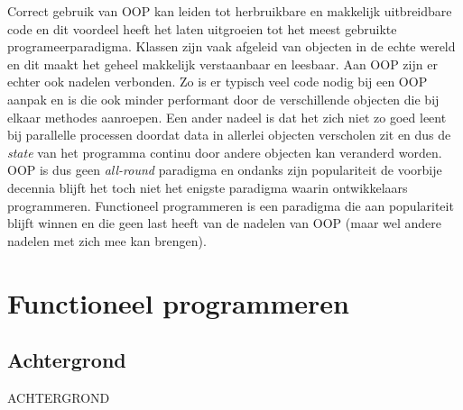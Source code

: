 Correct gebruik van OOP kan leiden tot herbruikbare en makkelijk uitbreidbare code en dit voordeel heeft het laten uitgroeien tot het meest gebruikte programeerparadigma. Klassen zijn vaak afgeleid van objecten in de echte wereld en dit maakt het geheel makkelijk verstaanbaar en leesbaar. Aan OOP zijn er echter ook nadelen verbonden. Zo is er typisch veel code nodig bij een OOP aanpak en is die ook minder performant door de verschillende objecten die bij elkaar methodes aanroepen. Een ander nadeel is dat het zich niet zo goed leent bij parallelle processen doordat data in allerlei objecten verscholen zit en dus de \textit{state} van het programma continu door andere objecten kan veranderd worden. OOP is dus geen \textit{all-round} paradigma en ondanks zijn populariteit de voorbije decennia blijft het toch niet het enigste paradigma waarin ontwikkelaars programmeren. Functioneel programmeren is een paradigma die aan populariteit blijft winnen en die geen last heeft van de nadelen van OOP (maar wel andere nadelen met zich mee kan brengen).

\section{Functioneel programmeren}
\subsection{Achtergrond}

ACHTERGROND





